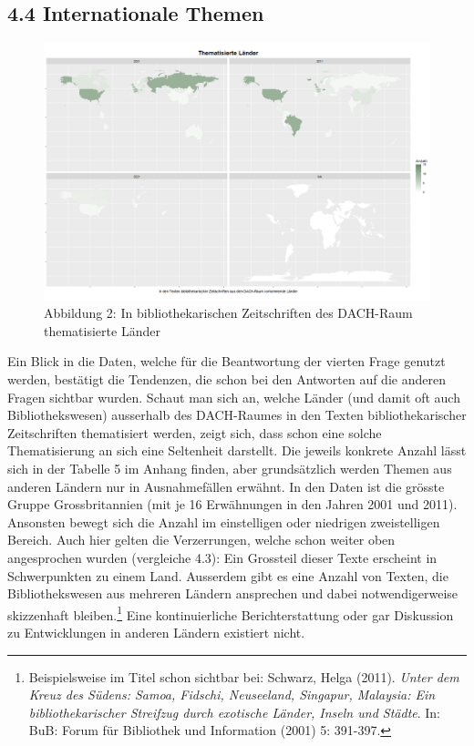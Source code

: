 \documentclass[a4paper,
fontsize=11pt,
oneside,
numbers=noperiodatend,
parskip=half-,
bibliography=totoc,
final
]{scrartcl}
\begin{document}
\hypertarget{internationale-themen-1}{%
\subsection{4.4 Internationale Themen}\label{internationale-themen-1}}

\begin{figure}[p!]
\centering
\includegraphics[width=1.3\textwidth, angle=90]{img/abb2.PNG}
\caption{Abbildung 2: In bibliothekarischen Zeitschriften des DACH-Raum
thematisierte Länder}
\end{figure}

Ein Blick in die Daten, welche für die Beantwortung der vierten Frage
genutzt werden, bestätigt die Tendenzen, die schon bei den Antworten auf
die anderen Fragen sichtbar wurden. Schaut man sich an, welche Länder
(und damit oft auch Bibliothekswesen) ausserhalb des DACH-Raumes in den
Texten bibliothekarischer Zeitschriften thematisiert werden, zeigt sich,
dass \linebreak schon eine solche Thematisierung an sich eine Seltenheit darstellt.
Die jeweils konkrete Anzahl lässt sich in der Tabelle 5 im Anhang
finden, aber grundsätzlich werden Themen aus anderen Ländern nur in
Ausnahmefällen erwähnt. In den Daten ist die grösste Gruppe
Grossbritannien (mit je 16 Erwähnungen in den Jahren 2001 und 2011).
Ansonsten bewegt sich die Anzahl im einstelligen oder niedrigen
zweistelligen Bereich. Auch hier gelten die Verzerrungen, welche schon
weiter oben angesprochen wurden (vergleiche 4.3): Ein Grossteil dieser
Texte erscheint in Schwerpunkten zu einem Land. Ausserdem gibt es eine
Anzahl von Texten, die Bibliothekswesen aus mehreren Ländern ansprechen
und dabei notwendigerweise skizzenhaft bleiben.\footnote{Beispielsweise
  im Titel schon sichtbar bei: Schwarz, Helga (2011). \emph{Unter dem
  Kreuz des Südens: Samoa, Fidschi, Neuseeland, Singapur, Malaysia: Ein
  bibliothekarischer Streifzug durch exotische Länder, Inseln und
  Städte}. In: BuB: Forum für Bibliothek und Information (2001) 5:
  391-397.} Eine kontinuierliche Berichterstattung oder gar Diskussion
zu Entwicklungen in anderen Ländern existiert nicht.
\end{document}
